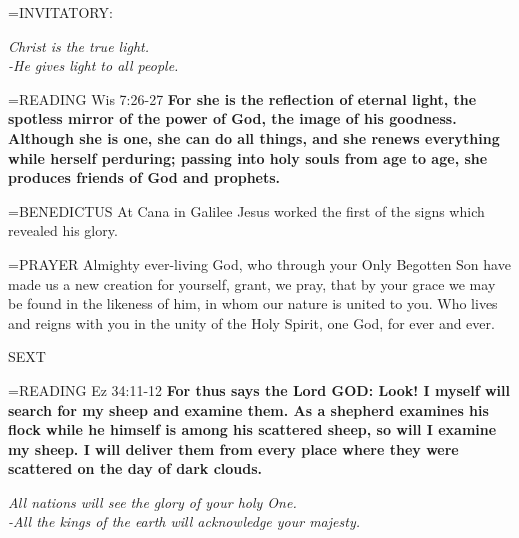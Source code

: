 \hangindent=\parindent \small{INVITATORY:}
\begin{center}
\textit{Christ is the true light.\\}
\textit{-He gives light to all people.\\}
\end{center}

\hangindent=\parindent \small{\uppercase{READING}}   Wis 7:26-27 \textbf{  For she is the reflection of eternal light, the spotless mirror of the power of God, the image of his goodness. Although she is one, she can do all things, and she renews everything while herself perduring; passing into holy souls from age to age, she produces friends of God and prophets.\\}

\hangindent=\parindent \small{BENEDICTUS 	At Cana in Galilee Jesus worked the first of the signs which revealed his glory.\\}

\hangindent=\parindent \small{PRAYER 	Almighty ever-living God, who through your Only Begotten Son have made us a new creation for yourself, grant, we pray, that by your grace we may be found in the likeness of him, in whom our nature is united to you. Who lives and reigns with you in the unity of the Holy Spirit, one God, for ever and ever.}

\begin{flushleft}\normalsize SEXT\\\end{flushleft}

\hangindent=\parindent \small{\uppercase{READING}}   Ez 34:11-12 \textbf{  For thus says the Lord GOD: Look! I myself will search for my sheep and examine them. As a shepherd examines his flock while he himself is among his scattered sheep, so will I examine my sheep. I will deliver them from every place where they were scattered on the day of dark clouds.\\}

\begin{center}
\textit{All nations will see the glory of your holy One.\\
-All the kings of the earth will acknowledge your majesty.}
\end{center}

